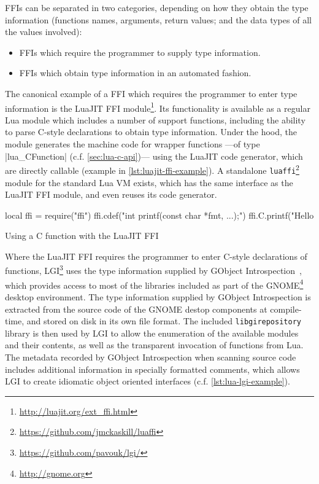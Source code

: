 FFIs can be separated in two categories, depending on how they obtain the type
information (functions names, arguments, return values; and the data types of
all the values involved):

\begin{itemize}

	\item FFIs which require the programmer to supply type information.

	\item FFIs which obtain type information in an automated fashion.

\end{itemize}

The canonical example of a FFI which requires the programmer to enter type
information is the \gls{LuaJIT} FFI
module\footnote{\url{http://luajit.org/ext_ffi.html}}. Its functionality is
available as a regular Lua module which includes a number of support
functions, including the ability to parse C-style declarations to obtain type
information. Under the hood, the module generates the machine code for wrapper
functions —of type \Mc|lua_CFunction| (c.f. \autoref{sec:lua-c-api})— using
the LuaJIT code generator, which are directly callable (example in
\autoref{lst:luajit-ffi-example}). A standalone
\verb|luaffi|\footnote{\url{https://github.com/jmckaskill/luaffi}} module for
the standard Lua \gls{VM} exists, which has the same interface as the LuaJIT
FFI module, and even reuses its code generator.

\begin{listing}[H]
	\begin{luacode}
  local ffi = require("ffi")
  ffi.cdef("int printf(const char *fmt, ...);")
  ffi.C.printf("Hello %
	\end{luacode}
	\caption{Using a C function with the LuaJIT FFI}
	\label{lst:luajit-ffi-example}
\end{listing}

Where the LuaJIT FFI requires the programmer to enter C-style declarations of
functions, LGI\footnote{\url{https://github.com/pavouk/lgi/}} uses the type
information supplied by GObject Introspection~\cite{gobject-introspection},
which provides access to most of the libraries included as part of the
GNOME\footnote{\url{http://gnome.org}} desktop environment. The type
information supplied by GObject Introspection is extracted from the source
code of the GNOME destop components at compile-time, and stored on disk in its
own file format. The included \verb|libgirepository| library is then used by
LGI to allow the enumeration of the available modules and their contents, as
well as the transparent invocation of functions from Lua. The metadata
recorded by GObject Introspection when scanning source code includes
additional information in specially formatted comments, which allows LGI to
create idiomatic object oriented interfaces (c.f. \autoref{lst:lua-lgi-example}).

